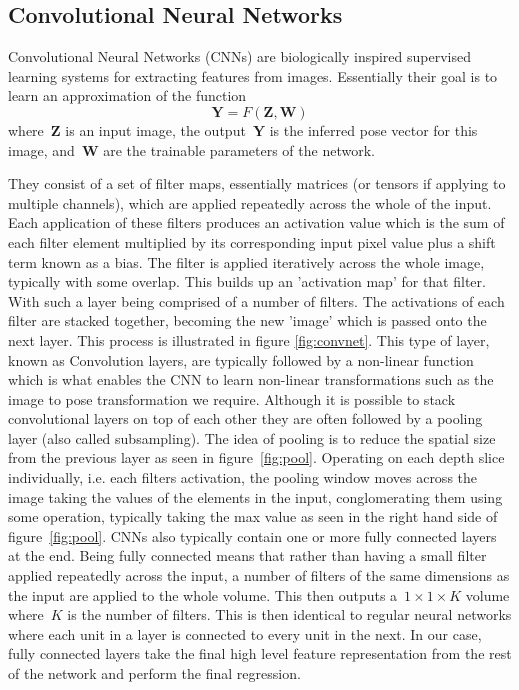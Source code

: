 \documentclass[11pt]{article} %
\begin{document}


\subsection{Convolutional Neural Networks}

Convolutional Neural Networks (CNNs) are biologically inspired supervised learning systems for extracting features from images. Essentially their goal is to learn an approximation of the function
\begin{equation}
\boldsymbol{Y} = F(\boldsymbol{Z},\boldsymbol{W})
\label{eq:networkF}
\end{equation}
where~$\boldsymbol{Z}$ is an input image, the output~$\boldsymbol{Y}$ is the inferred pose vector for this image, and~$\boldsymbol{W}$ are the trainable parameters of the network. 
 
They consist of a set of filter maps, essentially matrices (or tensors if applying to multiple channels), which are applied repeatedly across the whole of the input. Each application of these filters produces an activation value which is the sum of each filter element multiplied by its corresponding input pixel value plus a shift term known as a bias. The filter is applied iteratively across the whole image, typically with some overlap. This builds up an 'activation map' for that filter. With such a layer being comprised of a number of filters. The activations of each filter are stacked together, becoming the new 'image' which is passed onto the next layer. This process is illustrated in figure \ref{fig:convnet}. This type of layer, known as Convolution layers, are typically followed by a non-linear function which is what enables the CNN to learn non-linear transformations such as the image to pose transformation we require. Although it is possible to stack convolutional layers on top of each other they are often followed by a pooling layer (also called subsampling). The idea of pooling is to reduce the spatial size from the previous layer as seen in figure~\ref{fig:pool}. Operating on each depth slice individually, i.e. each filters activation, the pooling window moves across the image taking the values of the elements in the input, conglomerating them using some operation, typically taking the max value as seen in the right hand side of figure~\ref{fig:pool}. CNNs also typically contain one or more fully connected layers at the end. Being fully connected means that rather than having a small filter applied repeatedly across the input, a number of filters of the same dimensions as the input are applied to the whole volume. This then outputs a~$1\times 1 \times K$ volume where~$K$ is the number of filters. This is then identical to regular neural networks where each unit in a layer is connected to every unit in the next. In our case, fully connected layers take the final high level feature representation from the rest of the network and perform the final regression. 
\end{document}
